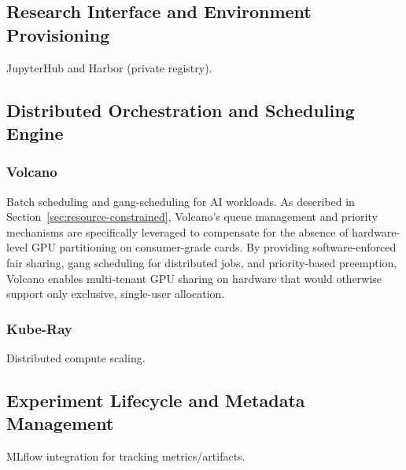 \subsection{Research Interface and Environment Provisioning}

JupyterHub and Harbor (private registry).

\subsection{Distributed Orchestration and Scheduling Engine}

\subsubsection{Volcano}

Batch scheduling and gang-scheduling for AI workloads. As described in Section~\ref{sec:resource-constrained}, Volcano's queue management and priority mechanisms are specifically leveraged to compensate for the absence of hardware-level GPU partitioning on consumer-grade cards. By providing software-enforced fair sharing, gang scheduling for distributed jobs, and priority-based preemption, Volcano enables multi-tenant GPU sharing on hardware that would otherwise support only exclusive, single-user allocation.

\subsubsection{Kube-Ray}

Distributed compute scaling.

\subsection{Experiment Lifecycle and Metadata Management}

MLflow integration for tracking metrics/artifacts.
